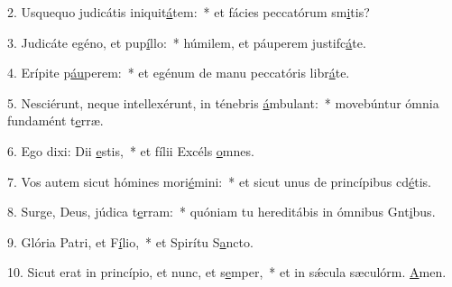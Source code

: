 2. Usquequo judicátis iniquit\uline{á}tem:~* et fácies peccatórum sm\uline{i}tis?\par 
3. Judicáte egéno, et pup\uline{í}llo:~* húmilem, et páuperem justifc\uline{á}te.\par 
4. Erípite p\uline{áu}perem:~* et egénum de manu peccatóris libr\uline{á}te.\par 
5. Nesciérunt, neque intellexérunt, in ténebris \uline{á}mbulant:~* movebúntur ómnia fundamént t\uline{e}rræ.\par 
6. Ego dixi: Dii \uline{e}stis,~* et fílii Excéls \uline{o}mnes.\par 
7. Vos autem sicut hómines mori\uline{é}mini:~* et sicut unus de princípibus cd\uline{é}tis.\par 
8. Surge, Deus, júdica t\uline{e}rram:~* quóniam tu hereditábis in ómnibus Gnt\uline{i}bus.\par 
9. Glória Patri, et F\uline{í}lio,~* et Spirítu S\uline{a}ncto.\par 
10. Sicut erat in princípio, et nunc, et s\uline{e}mper,~* et in sǽcula sæculórm. \uline{A}men.\par 
